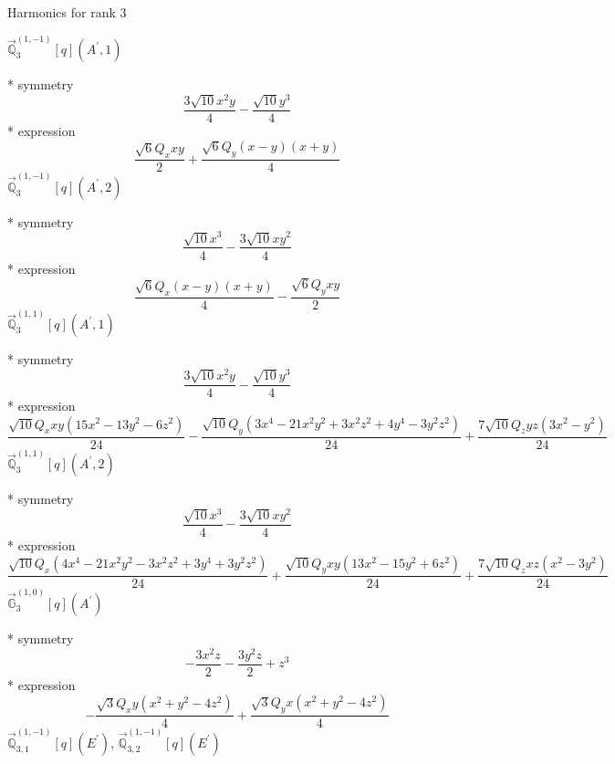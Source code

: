 \documentclass[fleqn,8pt]{jsarticle}
\begin{document}
\noindent * Harmonics for rank 3

\noindent\quad $\vec{\mathbb{Q}}_{3}^{(1,-1)}[q](A^{\prime},1)$

\noindent\quad ** symmetry
\begin{dmath*}
\frac{3 \sqrt{10} x^{2} y}{4} - \frac{\sqrt{10} y^{3}}{4}
\end{dmath*}
\noindent\quad ** expression
\begin{dmath*}
\frac{\sqrt{6} Q_{x} x y}{2} + \frac{\sqrt{6} Q_{y} \left(x - y\right) \left(x + y\right)}{4}
\end{dmath*}
\noindent\quad $\vec{\mathbb{Q}}_{3}^{(1,-1)}[q](A^{\prime},2)$

\noindent\quad ** symmetry
\begin{dmath*}
\frac{\sqrt{10} x^{3}}{4} - \frac{3 \sqrt{10} x y^{2}}{4}
\end{dmath*}
\noindent\quad ** expression
\begin{dmath*}
\frac{\sqrt{6} Q_{x} \left(x - y\right) \left(x + y\right)}{4} - \frac{\sqrt{6} Q_{y} x y}{2}
\end{dmath*}
\noindent\quad $\vec{\mathbb{Q}}_{3}^{(1,1)}[q](A^{\prime},1)$

\noindent\quad ** symmetry
\begin{dmath*}
\frac{3 \sqrt{10} x^{2} y}{4} - \frac{\sqrt{10} y^{3}}{4}
\end{dmath*}
\noindent\quad ** expression
\begin{dmath*}
\frac{\sqrt{10} Q_{x} x y \left(15 x^{2} - 13 y^{2} - 6 z^{2}\right)}{24} - \frac{\sqrt{10} Q_{y} \left(3 x^{4} - 21 x^{2} y^{2} + 3 x^{2} z^{2} + 4 y^{4} - 3 y^{2} z^{2}\right)}{24} + \frac{7 \sqrt{10} Q_{z} y z \left(3 x^{2} - y^{2}\right)}{24}
\end{dmath*}
\noindent\quad $\vec{\mathbb{Q}}_{3}^{(1,1)}[q](A^{\prime},2)$

\noindent\quad ** symmetry
\begin{dmath*}
\frac{\sqrt{10} x^{3}}{4} - \frac{3 \sqrt{10} x y^{2}}{4}
\end{dmath*}
\noindent\quad ** expression
\begin{dmath*}
\frac{\sqrt{10} Q_{x} \left(4 x^{4} - 21 x^{2} y^{2} - 3 x^{2} z^{2} + 3 y^{4} + 3 y^{2} z^{2}\right)}{24} + \frac{\sqrt{10} Q_{y} x y \left(13 x^{2} - 15 y^{2} + 6 z^{2}\right)}{24} + \frac{7 \sqrt{10} Q_{z} x z \left(x^{2} - 3 y^{2}\right)}{24}
\end{dmath*}
\noindent\quad $\vec{\mathbb{G}}_{3}^{(1,0)}[q](A^{\prime})$

\noindent\quad ** symmetry
\begin{dmath*}
- \frac{3 x^{2} z}{2} - \frac{3 y^{2} z}{2} + z^{3}
\end{dmath*}
\noindent\quad ** expression
\begin{dmath*}
- \frac{\sqrt{3} Q_{x} y \left(x^{2} + y^{2} - 4 z^{2}\right)}{4} + \frac{\sqrt{3} Q_{y} x \left(x^{2} + y^{2} - 4 z^{2}\right)}{4}
\end{dmath*}
\noindent\quad $\vec{\mathbb{Q}}_{3,1}^{(1,-1)}[q](E^{\prime})$, $\vec{\mathbb{Q}}_{3,2}^{(1,-1)}[q](E^{\prime})$
\end{document}
